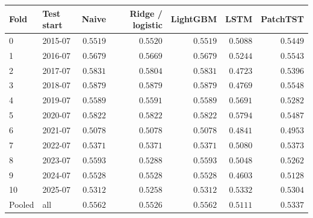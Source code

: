 \begin{tabular}{llrrrrr}
\toprule
Fold & Test start & Naive & Ridge / logistic & LightGBM & LSTM & PatchTST \\
\midrule
0 & 2015-07 & $0.5519$ & $0.5520$ & $0.5519$ & $0.5088$ & $0.5449$ \\
1 & 2016-07 & $0.5679$ & $0.5669$ & $0.5679$ & $0.5244$ & $0.5543$ \\
2 & 2017-07 & $0.5831$ & $0.5804$ & $0.5831$ & $0.4723$ & $0.5396$ \\
3 & 2018-07 & $0.5879$ & $0.5879$ & $0.5879$ & $0.4769$ & $0.5548$ \\
4 & 2019-07 & $0.5589$ & $0.5591$ & $0.5589$ & $0.5691$ & $0.5282$ \\
5 & 2020-07 & $0.5822$ & $0.5822$ & $0.5822$ & $0.5794$ & $0.5487$ \\
6 & 2021-07 & $0.5078$ & $0.5078$ & $0.5078$ & $0.4841$ & $0.4953$ \\
7 & 2022-07 & $0.5371$ & $0.5371$ & $0.5371$ & $0.5080$ & $0.5373$ \\
8 & 2023-07 & $0.5593$ & $0.5288$ & $0.5593$ & $0.5048$ & $0.5262$ \\
9 & 2024-07 & $0.5528$ & $0.5528$ & $0.5528$ & $0.4603$ & $0.5128$ \\
10 & 2025-07 & $0.5312$ & $0.5258$ & $0.5312$ & $0.5332$ & $0.5304$ \\
\midrule Pooled & all & $0.5562$ & $0.5526$ & $0.5562$ & $0.5111$ & $0.5337$ \\
\bottomrule
\end{tabular}
